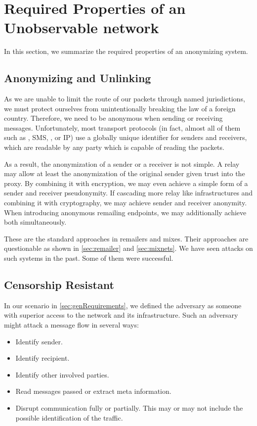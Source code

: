 \section{Required Properties of an Unobservable network}
In this section, we summarize the required properties of an anonymizing system.

\subsection{Anonymizing and Unlinking}
As we are unable to limit the route of our packets through named jurisdictions, we must protect ourselves from unintentionally breaking the law of a foreign country. Therefore, we need to be anonymous when sending or receiving messages. Unfortunately, most transport protocols (in fact, almost all of them such as , SMS, , or IP) use a globally unique identifier for senders and receivers, which are readable by any party which is capable of reading the packets. 

As a result, the anonymization of a sender or a receiver is not simple. A relay may allow at least the anonymization of the original sender given trust into the proxy. By combining it with encryption, we may even achieve a simple form of a sender and receiver pseudonymity. If cascading more relay like infrastructures and combining it with cryptography, we may achieve sender and receiver anonymity. When introducing anonymous remailing endpoints, we may additionally achieve both simultaneously.

These are the standard approaches in remailers and mixes. Their approaches are questionable as shown in \ref{sec:remailer} and \ref{sec:mixnets}. We have seen attacks on such systems in the past. Some of them were successful.

\subsection{Censorship Resistant}
In our scenario in \ref{sec:genRequirements}, we defined the adversary as someone with superior access to the network and its infrastructure. Such an adversary might attack a message flow in several ways:
\begin{itemize}
	\item Identify sender.
	\item Identify recipient.
	\item Identify other involved parties.
	\item Read messages passed or extract meta information.
	\item Disrupt communication fully or partially. This may or may not include the possible identification of the traffic.
\end{itemize}

